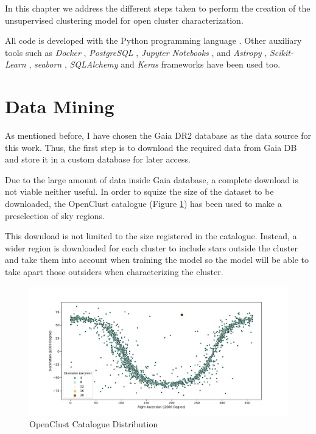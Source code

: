 \documentclass[11pt, a4paper, english]{book}
\begin{document}
In this chapter we address the different steps taken to perform the creation of the unsupervised clustering model for open cluster characterization.

All code is developed with the Python programming language \cite{Python3}. Other auxiliary tools such as \emph{Docker} \cite{merkel2014docker},
\emph{PostgreSQL} \cite{postgresql}, \emph{Jupyter Notebooks} \cite{Kluyver2016jupyter}, and \emph{Astropy} \cite{astropy:2013} \cite{astropy:2018},
\emph{Scikit-Learn} \cite{scikit-learn}, \emph{seaborn} \cite{michael_waskom_2017_883859}, \emph{SQLAlchemy} \cite{sqlalchemy} and
\emph{Keras} \cite{chollet2015keras} frameworks have been used too.

\section{Data Mining}

As mentioned before, I have chosen the Gaia DR2 database as the data source for this work. Thus, the first step is to download the required data from Gaia DB
and store it in a custom database for later access.

Due to the large amount of data inside Gaia database, a complete download is not viable neither useful.
In order to squize the size of the dataset to be downloaded, the OpenClust catalogue \cite{dias2002new} (Figure \ref{fig:OpenClustComplete})
has been used to make a preselection of sky regions.

This download is not limited to the size registered in the catalogue. Instead, a wider region is downloaded for each cluster to include
stars outside the cluster and take them into account when training the model so the model will be able to take apart those outsiders
when characterizing the cluster.

\begin{figure}[htbp]
  \centering
  \includegraphics[width=\columnwidth]{../figures/openclust_catalogue.pdf}
  \caption{OpenClust Catalogue Distribution}
  \label{fig:OpenClustComplete}
\end{figure}
\end{document}

